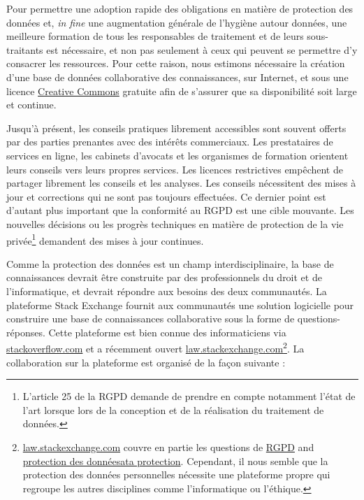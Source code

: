 \documentclass{scrlttr2}
\begin{document}
\begin{letter}{}
Pour permettre une adoption rapide des obligations en matière de
protection des données et, \emph{in fine} une augmentation générale de
l'hygiène autour données, une meilleure formation de tous les
responsables de traitement et de leurs sous-traitants est nécessaire, et
non pas seulement à ceux qui peuvent se permettre d'y consacrer les
ressources. Pour cette raison, nous estimons nécessaire la création
d'une base de données collaborative des connaissances, sur Internet, et
sous une licence \href{https://creativecommons.org/}{Creative Commons}
gratuite afin de s'assurer que sa disponibilité soit large et continue.

Jusqu'à présent, les conseils pratiques librement accessibles sont
souvent offerts par des parties prenantes avec des intérêts commerciaux.
Les prestataires de services en ligne, les cabinets d'avocats et les
organismes de formation orientent leurs conseils vers leurs propres
services. Les licences restrictives empêchent de partager librement les
conseils et les analyses. Les conseils nécessitent des mises à jour et
corrections qui ne sont pas toujours effectuées. Ce dernier point est
d'autant plus important que la conformité au RGPD est une cible
mouvante. Les nouvelles décisions ou les progrès techniques en matière
de protection de la vie privée\footnote{L'article 25 de la RGPD demande
  de prendre en compte notamment l'état de l'art lorsque lors de la
  conception et de la réalisation du traitement de données.} demandent
des mises à jour continues.

Comme la protection des données est un champ interdisciplinaire, la base
de connaissances devrait être construite par des professionnels du droit
et de l'informatique, et devrait répondre aux besoins des deux
communautés. La plateforme Stack Exchange fournit aux communautés une
solution logicielle pour construire une base de connaissances
collaborative sous la forme de questions-réponses. Cette plateforme est
bien connue des informaticiens via
\href{http://stackoverflow.com/}{stackoverflow.com} et a récemment
ouvert
\href{https://law.stackexchange.com}{law.stackexchange.com}\footnote{\href{https://law.stackexchange.com}{law.stackexchange.com}
  couvre en partie les questions de
  \href{https://law.stackexchange.com/questions/tagged/gdpr}{RGPD} and
  \href{https://law.stackexchange.com/questions/tagged/gdpr+data-protection}{protection
  des donnéesata protection}. Cependant, il nous semble que la
  protection des données personnelles nécessite une plateforme propre
  qui regroupe les autres disciplines comme l'informatique ou l'éthique.}.
La collaboration sur la plateforme est organisé de la façon suivante :


\end{letter}
\end{document}
